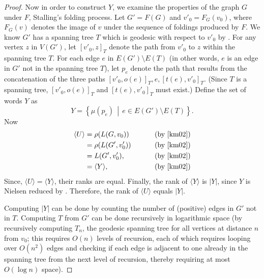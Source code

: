 \documentclass{article}
\newcommand{\gen}[1]{\langle #1 \rangle}
\begin{document}
\begin{proof}
  Now in order to construct $Y$, we examine the properties of the graph $G$ under $F$, Stalling's folding process.
  Let $G' = F(G)$ and $v'_0 = F_G(v_0)$, where $F_G(v)$ denotes the image of $v$ under the sequence of foldings produced by $F$.
  We know $G'$ has a spanning tree $T$ which is geodesic with respect to $v'_0$ by \cite[Lemma~6.6]{km02}.
  For any vertex $z$ in $V(G')$, let $[v'_0, z]_T$ denote the path from $v'_0$ to $z$ within the spanning tree $T$.
  For each edge $e$ in $E(G') \setminus E(T)$ (in other words, $e$ is an edge in $G'$ not in the spanning tree $T$), let $p_e$ denote the path that results from the concatenation of the three paths $[v'_0, o(e)]_T, e, [t(e), v'_0]_T$.
  (Since $T$ is a spanning tree, $[v'_0, o(e)]_T$ and $[t(e), v'_0]_T$ must exist.)
  Define the set of words $Y$ as
  \begin{equation*}
    Y = \left\{\mu(p_e) \, \middle| \, e \in E(G') \setminus E(T) \right\}.
  \end{equation*}
  Now
  \begin{align*}
    \gen{U} & = \rho(L(G, v_0)) & \qquad \text{ (by \cite[Proposition~3.8]{km02})} \\
            & = \rho(L(G', v'_0)) & \qquad \text{ (by \cite[Lemma~3.4]{km02})} \\
            & = L(G', v'_0), & \qquad \text{ (by \cite[Lemma~2.9]{km02})} \\
            & = \gen{Y}, & \qquad \text{ (by \cite[Lemma~6.1]{km02})}
  \end{align*}
  Since, $\gen{U} = \gen{Y}$, their ranks are equal.
  Finally, the rank of $\gen{Y}$ is $|Y|$, since $Y$ is Nielsen reduced by \cite[Proposition~6.7]{km02}.
  Therefore, the rank of $\gen{U}$ equals $|Y|$.

  Computing $|Y|$ can be done by counting the number of (positive) edges in $G'$ not in $T$.
  Computing $T$ from $G'$ can be done recursively in logarithmic space (by recursively computing $T_n$, the geodesic spanning tree for all vertices at distance $n$ from $v_0$; this requires $O(n)$ levels of recursion, each of which requires looping over $O(n^2)$ edges and checking if each edge is adjacent to one already in the spanning tree from the next level of recursion, thereby requiring at most $O(\log n)$ space).
\end{proof}
\end{document}
